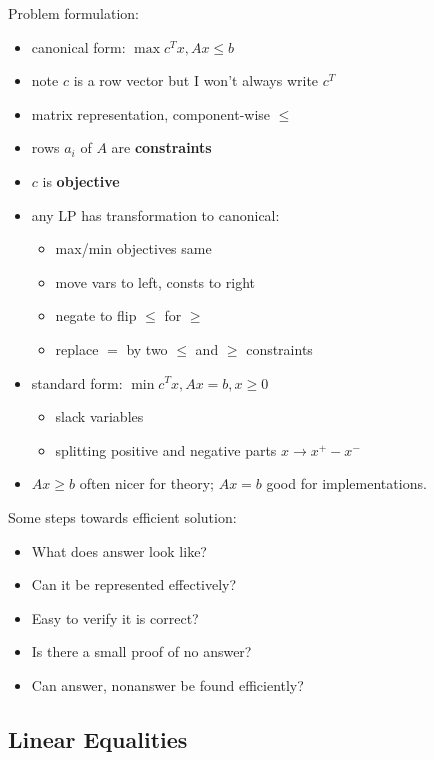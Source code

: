 \documentclass{article}
\begin{document}
Problem formulation:
\begin{itemize}
\item canonical form: $\max c^Tx, Ax \le b$
\item note $c$ is a row vector but I won't always write $c^T$
\item matrix representation, component-wise $\le$
\item rows $a_i$ of $A$ are {\bf constraints}
\item $c$ is {\bf objective}
\item any LP has transformation to canonical:
  \begin{itemize}
  \item max/min objectives same
  \item move vars to left, consts to right
  \item negate to flip $\le$ for $\ge$
  \item replace $=$ by two $\le$ and $\ge$ constraints
  \end{itemize}
\item standard form: $\min c^Tx, Ax=b, x\ge 0$
  \begin{itemize}
  \item slack variables
  \item splitting positive and negative parts $x \rightarrow x^+-x^-$
  \end{itemize}
\item $Ax \ge b$ often nicer for theory; $Ax=b$ good for
  implementations.
\end{itemize}


Some steps towards efficient solution:
\begin{itemize}
\item What does answer look like?
\item Can it be represented effectively?
\item Easy to verify it is correct?
\item Is there a small proof of no answer?
\item Can answer, nonanswer be found efficiently?
\end{itemize}

\subsection{Linear Equalities}
\end{document}

